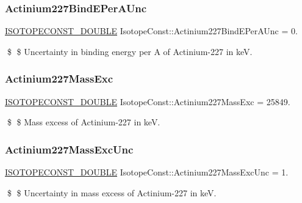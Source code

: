 \subsubsection{\texorpdfstring{Actinium227\+Bind\+E\+Per\+A\+Unc}{Actinium227BindEPerAUnc}}
{\footnotesize\ttfamily \mbox{\hyperlink{group___isotope_const-_macros_ga8f45a7272ce02c0b4c65c44636ed719a}{I\+S\+O\+T\+O\+P\+E\+C\+O\+N\+S\+T\+\_\+\+D\+O\+U\+B\+LE}} Isotope\+Const\+::\+Actinium227\+Bind\+E\+Per\+A\+Unc = 0.}

\$ \$ Uncertainty in binding energy per A of Actinium-\/227 in keV. \mbox{\label{group___isotope_const-_actinium-_ac227_gac5035d1ce094f3500239d68df50db0bd}} 
\subsubsection{\texorpdfstring{Actinium227\+Mass\+Exc}{Actinium227MassExc}}
{\footnotesize\ttfamily \mbox{\hyperlink{group___isotope_const-_macros_ga8f45a7272ce02c0b4c65c44636ed719a}{I\+S\+O\+T\+O\+P\+E\+C\+O\+N\+S\+T\+\_\+\+D\+O\+U\+B\+LE}} Isotope\+Const\+::\+Actinium227\+Mass\+Exc = 25849.}

\$ \$ Mass excess of Actinium-\/227 in keV. \mbox{\label{group___isotope_const-_actinium-_ac227_gaf6ee6c32840d1f3f2311e26aef7c1baa}} 
\subsubsection{\texorpdfstring{Actinium227\+Mass\+Exc\+Unc}{Actinium227MassExcUnc}}
{\footnotesize\ttfamily \mbox{\hyperlink{group___isotope_const-_macros_ga8f45a7272ce02c0b4c65c44636ed719a}{I\+S\+O\+T\+O\+P\+E\+C\+O\+N\+S\+T\+\_\+\+D\+O\+U\+B\+LE}} Isotope\+Const\+::\+Actinium227\+Mass\+Exc\+Unc = 1.}

\$ \$ Uncertainty in mass excess of Actinium-\/227 in keV. \mbox{\label{group___isotope_const-_actinium-_ac227_ga2bb9df4f248daabb3c4053518c4b0d1a}} 
